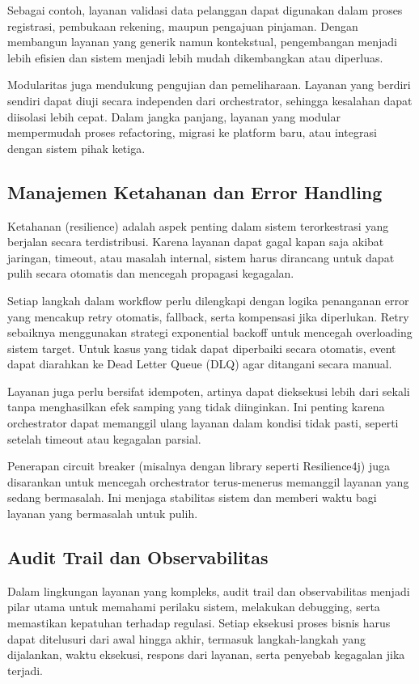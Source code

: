 Sebagai contoh, layanan validasi data pelanggan dapat digunakan dalam proses registrasi, pembukaan rekening, maupun pengajuan pinjaman. Dengan membangun layanan yang generik namun kontekstual, pengembangan menjadi lebih efisien dan sistem menjadi lebih mudah dikembangkan atau diperluas.

Modularitas juga mendukung pengujian dan pemeliharaan. Layanan yang berdiri sendiri dapat diuji secara independen dari orchestrator, sehingga kesalahan dapat diisolasi lebih cepat. Dalam jangka panjang, layanan yang modular mempermudah proses refactoring, migrasi ke platform baru, atau integrasi dengan sistem pihak ketiga.

\subsection{Manajemen Ketahanan dan Error Handling}

Ketahanan (resilience) adalah aspek penting dalam sistem terorkestrasi yang berjalan secara terdistribusi. Karena layanan dapat gagal kapan saja akibat jaringan, timeout, atau masalah internal, sistem harus dirancang untuk dapat pulih secara otomatis dan mencegah propagasi kegagalan.

Setiap langkah dalam workflow perlu dilengkapi dengan logika penanganan error yang mencakup retry otomatis, fallback, serta kompensasi jika diperlukan. Retry sebaiknya menggunakan strategi exponential backoff untuk mencegah overloading sistem target. Untuk kasus yang tidak dapat diperbaiki secara otomatis, event dapat diarahkan ke Dead Letter Queue (DLQ) agar ditangani secara manual.

Layanan juga perlu bersifat idempoten, artinya dapat dieksekusi lebih dari sekali tanpa menghasilkan efek samping yang tidak diinginkan. Ini penting karena orchestrator dapat memanggil ulang layanan dalam kondisi tidak pasti, seperti setelah timeout atau kegagalan parsial.

Penerapan circuit breaker (misalnya dengan library seperti Resilience4j) juga disarankan untuk mencegah orchestrator terus-menerus memanggil layanan yang sedang bermasalah. Ini menjaga stabilitas sistem dan memberi waktu bagi layanan yang bermasalah untuk pulih.

\subsection{Audit Trail dan Observabilitas}

Dalam lingkungan layanan yang kompleks, audit trail dan observabilitas menjadi pilar utama untuk memahami perilaku sistem, melakukan debugging, serta memastikan kepatuhan terhadap regulasi. Setiap eksekusi proses bisnis harus dapat ditelusuri dari awal hingga akhir, termasuk langkah-langkah yang dijalankan, waktu eksekusi, respons dari layanan, serta penyebab kegagalan jika terjadi.

